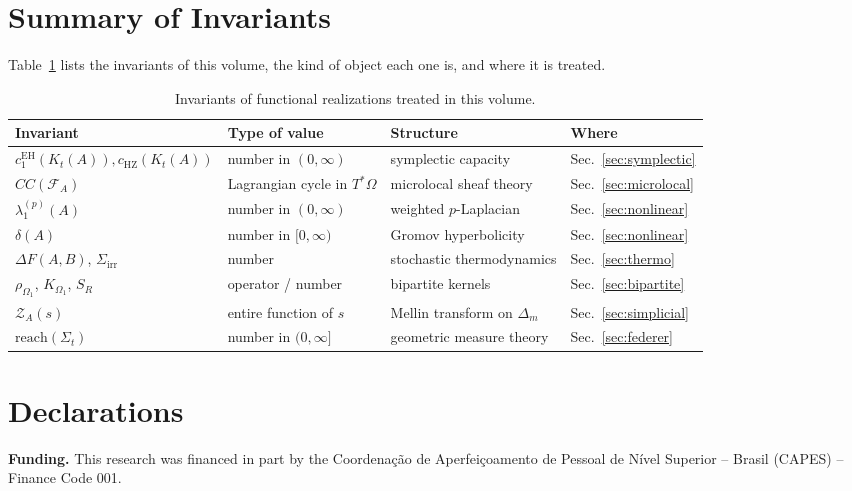 \documentclass[11pt,a4paper,reqno]{amsart}
\theoremstyle{definition}
\theoremstyle{remark}
\numberwithin{equation}{section}
\begin{document}
\section{Summary of Invariants}
\label{sec:taxonomy}

Table~\ref{tab:taxonomy} lists the invariants of this volume, the kind of object each one is, and where it is treated.

\begin{table}[htbp]
\centering
\small
\caption{Invariants of functional realizations treated in this volume.}
\label{tab:taxonomy}
\begin{tabular}{llll}
\toprule
\textbf{Invariant} & \textbf{Type of value} & \textbf{Structure} & \textbf{Where} \\
\midrule
$c_1^{\mathrm{EH}}(K_t(A)), c_{\mathrm{HZ}}(K_t(A))$ & number in $(0,\infty)$ & symplectic capacity & Sec.~\ref{sec:symplectic} \\
$CC(\mathcal{F}_A)$ & Lagrangian cycle in $T^*\Omega$ & microlocal sheaf theory & Sec.~\ref{sec:microlocal} \\
$\lambda_1^{(p)}(A)$ & number in $(0,\infty)$ & weighted $p$-Laplacian & Sec.~\ref{sec:nonlinear} \\
$\delta(A)$ & number in $[0,\infty)$ & Gromov hyperbolicity & Sec.~\ref{sec:nonlinear} \\
$\Delta F(A,B)$, $\Sigma_{\mathrm{irr}}$ & number & stochastic thermodynamics & Sec.~\ref{sec:thermo} \\
$\rho_{\Omega_1}$, $K_{\Omega_1}$, $S_R$ & operator / number & bipartite kernels & Sec.~\ref{sec:bipartite} \\
$\mathcal{Z}_A(s)$ & entire function of $s$ & Mellin transform on $\Delta_m$ & Sec.~\ref{sec:simplicial} \\
$\mathrm{reach}(\Sigma_t)$ & number in $(0,\infty]$ & geometric measure theory & Sec.~\ref{sec:federer} \\
\bottomrule
\end{tabular}
\end{table}

\section*{Declarations}

\noindent\textbf{Funding.} This research was financed in part by the
Coordena\c{c}\~ao de Aperfei\c{c}oamento de Pessoal de N\'ivel Superior -- Brasil
(CAPES) -- Finance Code 001.
\end{document}
